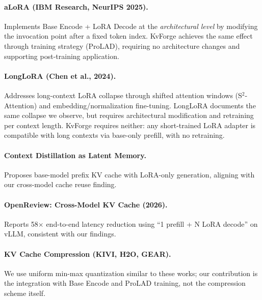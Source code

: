 \documentclass[11pt]{article}
\begin{document}
\paragraph{aLoRA (IBM Research, NeurIPS 2025).}
Implements Base Encode + LoRA Decode at the \emph{architectural level} by modifying the invocation point after a fixed token index. KvForge achieves the same effect through training strategy (ProLAD), requiring no architecture changes and supporting post-training application.

\paragraph{LongLoRA (Chen et al., 2024).}
Addresses long-context LoRA collapse through shifted attention windows (S$^2$-Attention) and embedding/normalization fine-tuning. LongLoRA documents the same collapse we observe, but requires architectural modification and retraining per context length. KvForge requires neither: any short-trained LoRA adapter is compatible with long contexts via base-only prefill, with no retraining.

\paragraph{Context Distillation as Latent Memory.}
Proposes base-model prefix KV cache with LoRA-only generation, aligning with our cross-model cache reuse finding.

\paragraph{OpenReview: Cross-Model KV Cache (2026).}
Reports 58$\times$ end-to-end latency reduction using ``1 prefill + N LoRA decode'' on vLLM, consistent with our findings.

\paragraph{KV Cache Compression (KIVI, H2O, GEAR).}
We use uniform min-max quantization similar to these works; our contribution is the integration with Base Encode and ProLAD training, not the compression scheme itself.
\end{document}
